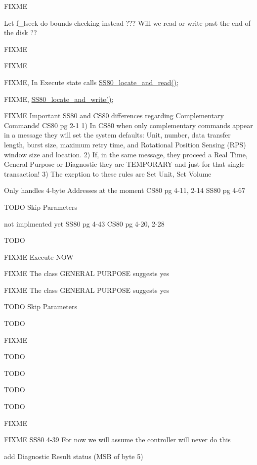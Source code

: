 \begin{DoxyRefList}
F\+I\+X\+ME  
\item[\label{todo__todo000055}%
\hypertarget{todo__todo000055}{}%
Global \hyperlink{ss80_8h_a0d2e3b28c642ea89fea6ff6f8ced5a3b}{S\+S80\+\_\+cmd\+\_\+seek} (void)]Let f\+\_\+lseek do bounds checking instead ??? Will we read or write past the end of the disk ??  
\item[\label{todo__todo000027}%
\hypertarget{todo__todo000027}{}%
Global \hyperlink{ss80_8h_a98c1da720b6dbe5ee9f13b914a913e17}{S\+S80\+\_\+\+Command\+\_\+\+State} (void)]F\+I\+X\+ME 

F\+I\+X\+ME 

F\+I\+X\+ME, In Execute state calls \hyperlink{ss80_8c_acad6de863f4566b55cb8860eb1ffd09c}{S\+S80\+\_\+locate\+\_\+and\+\_\+read()}; 

F\+I\+X\+ME, \hyperlink{ss80_8c_a41ef37ec5419463815401485cfcb62b1}{S\+S80\+\_\+locate\+\_\+and\+\_\+write()}; 

F\+I\+X\+ME Important S\+S80 and C\+S80 differences regarding Complementary Commands! C\+S80 pg 2-\/1 1) In C\+S80 when only complementary commands appear in a message they will set the system defaults\+: Unit, number, data transfer length, burst size, maximum retry time, and Rotational Position Sensing (R\+PS) window size and location. 2) If, in the same message, they proceed a Real Time, General Purpose or Diagnostic they are T\+E\+M\+P\+O\+R\+A\+RY and just for that single transaction! 3) The exeption to these rules are Set Unit, Set Volume 

Only handles 4-\/byte Addresses at the moment C\+S80 pg 4-\/11, 2-\/14 S\+S80 pg 4-\/67 

T\+O\+DO Skip Parameters 

not implmented yet S\+S80 pg 4-\/43 C\+S80 pg 4-\/20, 2-\/28 

T\+O\+DO 

F\+I\+X\+ME Execute N\+OW 

F\+I\+X\+ME The class G\+E\+N\+E\+R\+AL P\+U\+R\+P\+O\+SE suggests yes 

F\+I\+X\+ME The class G\+E\+N\+E\+R\+AL P\+U\+R\+P\+O\+SE suggests yes 

T\+O\+DO Skip Parameters 

T\+O\+DO 

F\+I\+X\+ME 

T\+O\+DO 

T\+O\+DO 

T\+O\+DO 

T\+O\+DO  
\item[\label{todo__todo000023}%
\hypertarget{todo__todo000023}{}%
Global \hyperlink{ss80_8h_a46587aecd8aff545fb96ef5b308f28ff}{S\+S80\+\_\+init} (void)]F\+I\+X\+ME  
\item[\label{todo__todo000024}%
\hypertarget{todo__todo000024}{}%
Global \hyperlink{ss80_8h_acad6de863f4566b55cb8860eb1ffd09c}{S\+S80\+\_\+locate\+\_\+and\+\_\+read} (void)]F\+I\+X\+ME S\+S80 4-\/39 For now we will assume the controller will never do this  
\item[\label{todo__todo000025}%
\hypertarget{todo__todo000025}{}%
Global \hyperlink{ss80_8h_ac4c1287b3b8b6a51f5b79522c62d4cea}{S\+S80\+\_\+send\+\_\+status} (void)]add Diagnostic Result status (M\+SB of byte 5) 


\end{DoxyRefList}

